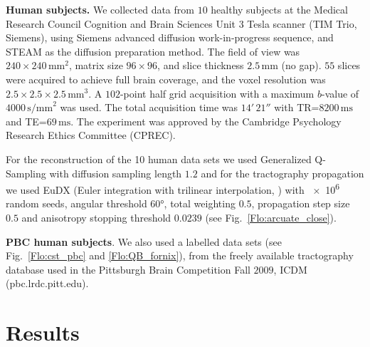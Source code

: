 \documentclass{bioinfo}
\begin{document}
\begin{methods}
\textbf{Human subjects.} We collected data from $10$ healthy subjects at
the Medical Research Council Cognition and Brain Sciences Unit 3 Tesla
scanner (TIM Trio, Siemens), using Siemens advanced diffusion
work-in-progress sequence, and STEAM \citep{merboldt1992diffusion,MAB04}
as the diffusion preparation method. The field of view was
$240\times240\,\textrm{mm}^{2}$, matrix size $96\times96$, and slice
thickness $2.5\,\textrm{mm}$ (no gap).  $55$ slices were acquired to
achieve full brain coverage, and the voxel resolution was
$2.5\times2.5\times2.5\,\textrm{mm}^{3}$. A $102$-point half grid
acquisition \citep{Yeh2010} with a maximum $b$-value of $4000\,
\textrm{s/mm}^{2}$ was used.  The total acquisition time was $14'\,21''$
with TR=$8200\,\textrm{ms}$ and TE=$69\,\textrm{ms}$. The experiment was
approved by the Cambridge Psychology Research Ethics Committee (CPREC).

For the reconstruction of the 10 human data sets we used Generalized
Q-Sampling \citep{Yeh2010} with diffusion sampling length $1.2$ and for
the tractography propagation we used EuDX (Euler integration with
trilinear interpolation, \citep{Garyfallidis_thesis}) with \num{e6}
random seeds, angular threshold \ang{60}, total weighting $0.5$,
propagation step size $0.5$ and anisotropy stopping threshold $0.0239$
(see 
Fig.~\ref{Flo:arcuate_close}).

\textbf{PBC human subjects}. We also used a labelled data sets (see
Fig.~\ref{Flo:cst_pbc} and \ref{Flo:QB_fornix}), from the freely
available tractography database used in the Pittsburgh Brain Competition
Fall $2009$, ICDM (pbc.lrdc.pitt.edu).

\end{methods}

\section{Results}
\end{document}
